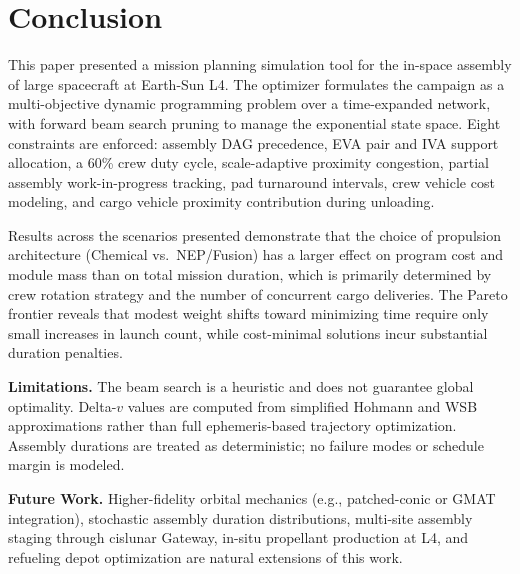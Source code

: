 \section{Conclusion}

This paper presented a mission planning simulation tool for the
in-space assembly of large spacecraft at Earth-Sun L4. The optimizer
formulates the campaign as a multi-objective dynamic programming
problem over a time-expanded network, with forward beam search
pruning to manage the exponential state space. Eight constraints
are enforced: assembly DAG precedence, EVA pair and IVA support
allocation, a 60\% crew duty cycle, scale-adaptive proximity
congestion, partial assembly work-in-progress tracking, pad
turnaround intervals, crew vehicle cost modeling, and cargo
vehicle proximity contribution during unloading.

Results across the scenarios presented demonstrate that the
choice of propulsion architecture (Chemical vs.\ NEP/Fusion)
has a larger effect on program cost and module mass than on
total mission duration, which is primarily determined by crew
rotation strategy and the number of concurrent cargo deliveries.
The Pareto frontier reveals that modest weight shifts toward
minimizing time require only small increases in launch count,
while cost-minimal solutions incur substantial duration penalties.

\textbf{Limitations.} The beam search is a heuristic and
does not guarantee global optimality. Delta-$v$ values are
computed from simplified Hohmann and WSB approximations rather
than full ephemeris-based trajectory optimization. Assembly
durations are treated as deterministic; no failure modes or
schedule margin is modeled.

\textbf{Future Work.} Higher-fidelity orbital mechanics
(e.g., patched-conic or GMAT integration), stochastic assembly
duration distributions, multi-site assembly staging through
cislunar Gateway, in-situ propellant production at L4, and
refueling depot optimization are natural extensions of this work.

